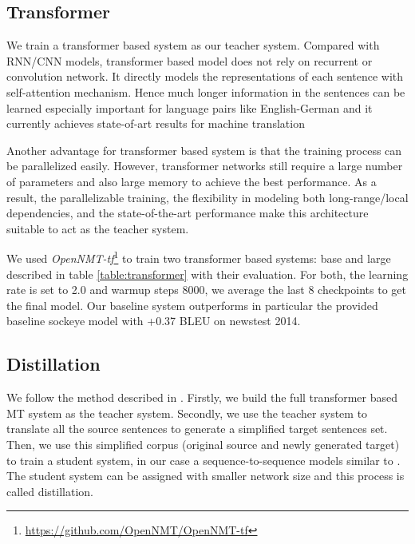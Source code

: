 \documentclass[11pt,a4paper]{article}
\begin{document}
\subsection{Transformer}
\label{transformer}
We train a transformer based system \cite{vaswani2017attention} as our teacher system.
Compared with RNN/CNN models, transformer based model does not rely on recurrent or convolution network.
It directly models the representations of each sentence with self-attention mechanism.
Hence much longer information in the sentences can be learned especially important for language pairs like English-German and it currently achieves state-of-art results for machine translation \cite{DBLP:journals/corr/abs-1803-02155}

Another advantage for transformer based system is that the training process can be parallelized easily.
However, transformer networks still require a large number of parameters and also large memory to achieve the best performance.
As a result, the parallelizable training, the flexibility in modeling both long-range/local
dependencies, and the state-of-the-art performance make this architecture suitable to act as the teacher system.

We used \textit{OpenNMT-tf}\footnote{\url{https://github.com/OpenNMT/OpenNMT-tf}} to train two transformer based systems: base and large described in table \ref{table:transformer} with their evaluation. For both, the learning rate is set to 2.0 and warmup steps 8000, we average the last 8 checkpoints to get the final model. Our baseline system outperforms in particular the provided baseline sockeye model with +0.37 BLEU on newstest 2014.

\subsection{Distillation}
\label{distill}

We follow the method described in . Firstly, we build the full transformer based MT system \cite{vaswani2017attention} as the teacher system. Secondly, we use the teacher system to translate all the source sentences to generate a simplified target sentences set.
Then, we use this simplified corpus (original source and newly generated target) to train a student system, in our case a sequence-to-sequence models similar to .
The student system can be assigned with smaller network size and this process is called distillation.
\end{document}
